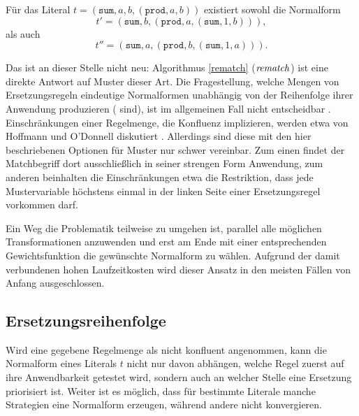 Für das Literal $t = (\texttt{sum}, a, b, (\texttt{prod}, a, b))$ existiert sowohl die Normalform 
$$t' = (\texttt{sum}, b, (\texttt{prod}, a, (\texttt{sum}, 1, b))),$$ 
als auch 
$$t'' = (\texttt{sum}, a, (\texttt{prod}, b, (\texttt{sum}, 1, a))).$$

Das ist an dieser Stelle nicht neu: Algorithmus \ref{rematch} ($\mathit{rematch}$) ist eine direkte Antwort auf Muster dieser Art. Die Fragestellung, welche Mengen von Ersetzungsregeln eindeutige Normalformen unabhängig von der Reihenfolge ihrer Anwendung produzieren ( sind), ist im allgemeinen Fall nicht entscheidbar \cite{KonfluenzUnentscheidbar}.
Einschränkungen einer Regelmenge, die Konfluenz implizieren, werden etwa von Hoffmann und O'Donnell diskutiert \cite{hoffmann1982programming}. Allerdings sind diese mit den hier beschriebenen Optionen für Muster nur schwer vereinbar. Zum einen findet der Matchbegriff dort ausschließlich in seiner strengen Form Anwendung, zum anderen beinhalten die Einschränkungen etwa die Restriktion, dass jede Mustervariable höchstens einmal in der linken Seite einer Ersetzungsregel vorkommen darf.

Ein Weg die Problematik teilweise zu umgehen ist, parallel alle möglichen Transformationen anzuwenden und erst am Ende mit einer entsprechenden Gewichtsfunktion die gewünschte Normalform zu wählen. Aufgrund der damit verbundenen hohen Laufzeitkosten wird dieser Ansatz in den meisten Fällen von Anfang ausgeschlossen.


\subsection{Ersetzungsreihenfolge}
Wird eine gegebene Regelmenge als nicht konfluent angenommen, kann die  Normalform eines Literals $t$ nicht nur davon abhängen, welche Regel zuerst auf ihre Anwendbarkeit getestet wird, sondern auch an welcher Stelle eine Ersetzung priorisiert ist. Weiter ist es möglich, dass für bestimmte Literale manche Strategien eine Normalform erzeugen, während andere nicht konvergieren.

